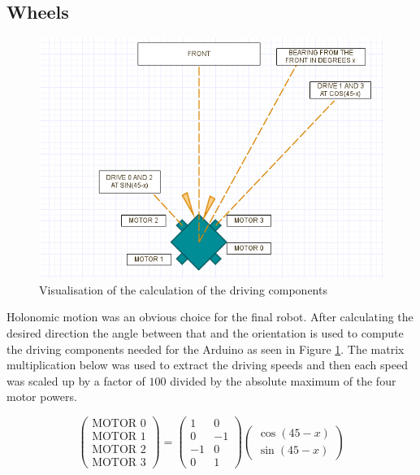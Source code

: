 \documentclass[a4paper,12pt]{article}
\begin{document}
\subsection{Wheels}
\begin{figure}
\centering
\includegraphics[scale=.5]{holonomics.png}
\caption{Visualisation of the calculation of the driving components}
\label{fig:components}
\end{figure}

Holonomic motion was an obvious choice for the final robot. After calculating the desired direction the angle between that and the orientation is used to compute the driving components needed for the Arduino as seen in Figure \ref{fig:components}. The matrix multiplication below was used to extract the driving speeds and then each speed was scaled up by a factor of $100$ divided by the absolute maximum of the four motor powers.

$$\begin{pmatrix}
\text{MOTOR 0}\\ 
\text{MOTOR 1}\\ 
\text{MOTOR 2}\\ 
\text{MOTOR 3}
\end{pmatrix}=
\begin{pmatrix}
1 & 0\\ 
0 & -1\\ 
-1 & 0\\ 
0 & 1 
\end{pmatrix}
\begin{pmatrix}
\cos(45-x)\\ 
\sin(45-x)
\end{pmatrix}$$
\end{document}
